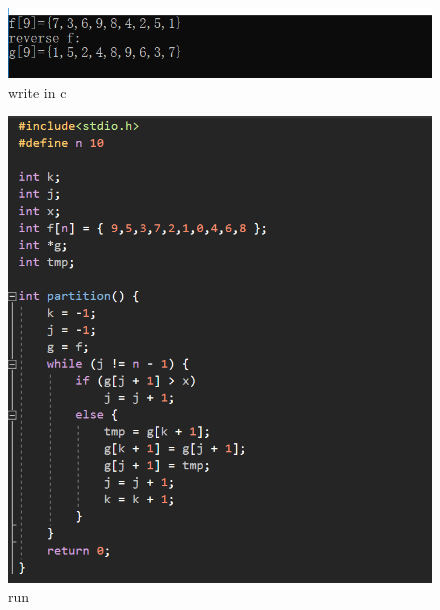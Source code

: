 \documentclass[11pt,a4paper,fleqn]{article}
\begin{document}
\begin{figure}[h!]
\centering
\includegraphics{3.png}
\caption{ write in c}
\label{fig}
\end{figure}

\begin{figure}[h!]
\centering
\includegraphics{4.png}
\caption{ run }
\label{fig}
\end{figure}



%
%
\end{document}
